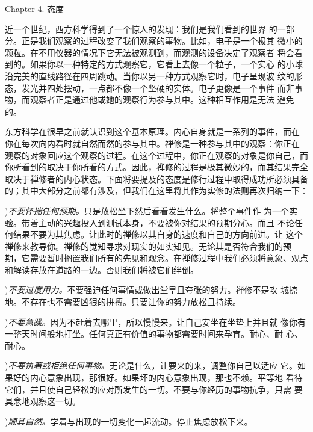 


\beginchapter Chapter 4. 态度


{
\parindent=3pc
\noindent\hang{}
\1%
{近一个世纪}，西方科学得到了一个惊人的发现：我们是我们看到的世界
的一部分。正是我们观察的过程改变了我们观察的事物。比如，电子是一个极其
微小的颗粒。在不用仪器的情况下它无法被观测到，而观测的设备决定了观察者
将会看到的。如果你以一种特定的方式观察它，它看上去像一个粒子，一个实心
的小球沿完美的直线路径在四周跳动。当你以另一种方式观察它时，电子呈现波
纹的形态，发光并四处摆动，一点都不像一个坚硬的实体。电子更像是一个事件
而非事物，而观察者正是通过他或她的观察行为参与其中。这种相互作用是无法
避免的。

}

东方科学在很早之前就认识到这个基本原理。内心自身就是一系列的事件，而在
你在每次向内看时就自然而然的参与其中。禅修是一种参与其中的观察：你正在
观察的对象回应这个观察的过程。在这个过程中，你正在观察的对象是你自己，而
你所看到的取决于你所看的方式。因此，禅修的过程是极其微妙的，而其结果完全
取决于禅修者的内心状态。下面将要提及的态度是修行过程中取得成功所必须具备
的；其中大部分之前都有涉及，但我们在这里将其作为实修的法则再次归纳一下：

\medbreak
{}){\it 不要怀揣任何预期。}只是放松坐下然后看看发生什么。将整个事件作
为一个实验。带着主动的兴趣投入到测试本身，不要被你对结果的预期分心。而且
不论任何结果不要为其焦虑。让此时的禅修以其自身的速度和自己的方向前进。让
这个禅修来教导你。禅修的觉知寻求对现实的如实知见。无论其是否符合我们的预
期，它需要暂时搁置我们所有的先见和观念。在禅修过程中我们必须将意象、观点
和解读存放在道路的一边。否则我们将被它们绊倒。

){\it 不要过度用力。}不要强迫任何事情或做出堂皇且夸张的努力。禅修不是攻
城掠地。不存在也不需要凶狠的拼搏。只要让你的努力放松且持续。

){\it 不要急躁。}因为不赶着去哪里，所以慢慢来。让自己安坐在坐垫上并且就
像你有一整天时间般地打坐。任何真正有价值的事物都需要时间来孕育。耐心、耐
心、耐心。

){\it 不要执著或拒绝任何事物。}无论是什么，让要来的来，调整你自己以适应
它。如果好的内心意象出现，那很好。如果坏的内心意象出现，那也不赖。平等地
看待它们，并且使自己轻松的应对所发生的一切。不要与你经历的事物抗争，只需
要具念地观察这一切。

){\it 顺其自然。}学着与出现的一切变化一起流动。停止焦虑放松下来。


\endchapter

\byebye
